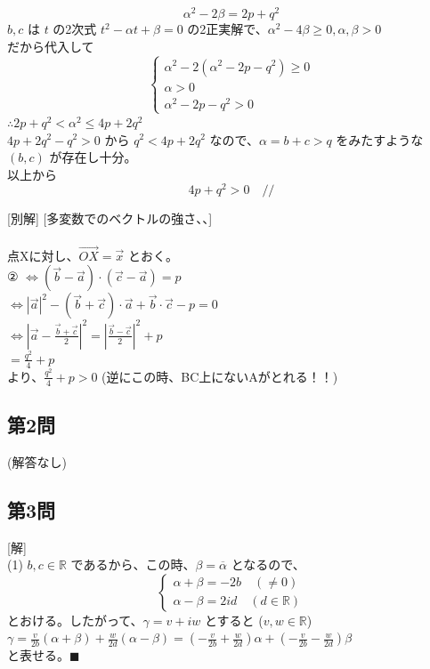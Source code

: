 \documentclass[../main.tex]{subfiles}
\begin{document}
\[ \alpha^2 - 2\beta = 2p + q^2 \]
$b, c$ は $t$ の2次式 $t^2 - \alpha t + \beta = 0$ の2正実解で、$\alpha^2 - 4\beta \ge 0, \alpha, \beta > 0$\\
だから代入して
\[
  \begin{cases}
    \alpha^2 - 2(\alpha^2 - 2p - q^2) \ge 0 \\
    \alpha > 0 \\
    \alpha^2 - 2p - q^2 > 0
  \end{cases}
\]
$\therefore 2p + q^2 < \alpha^2 \le 4p + 2q^2$\\
$4p + 2q^2 - q^2 > 0$ から $q^2 < 4p + 2q^2$ なので、$\alpha = b+c > q$ をみたすような $(b, c)$ が存在し十分。\\
以上から
\[ 4p + q^2 > 0 \quad \text{//} \]

[別解] [多変数でのベクトルの強さ、、]\\
\\
点Xに対し、$\overrightarrow{OX} = \vec{x}$ とおく。\\
② $\iff (\vec{b} - \vec{a}) \cdot (\vec{c} - \vec{a}) = p$\\
$\iff |\vec{a}|^2 - (\vec{b} + \vec{c}) \cdot \vec{a} + \vec{b} \cdot \vec{c} - p = 0$\\
$\iff \left| \vec{a} - \frac{\vec{b} + \vec{c}}{2} \right|^2 = \left| \frac{\vec{b} - \vec{c}}{2} \right|^2 + p$\\
$= \frac{q^2}{4} + p$\\
より、$\frac{q^2}{4} + p > 0$ (逆にこの時、BC上にないAがとれる！！)


\subsection*{第2問}
(解答なし)

\subsection*{第3問}
[解]\\
(1) $b, c \in \mathbb{R}$ であるから、この時、$\beta = \overline{\alpha}$ となるので、
\[
  \begin{cases}
    \alpha + \beta = -2b \quad (\neq 0) \\
    \alpha - \beta = 2id \quad (d \in \mathbb{R})
  \end{cases}
\]
とおける。したがって、$\gamma = v + iw$ とすると ($v, w \in \mathbb{R}$)\\
$\gamma = \frac{v}{2b}(\alpha + \beta) + \frac{w}{2d}(\alpha - \beta) = \left( -\frac{v}{2b} + \frac{w}{2d} \right) \alpha + \left( -\frac{v}{2b} - \frac{w}{2d} \right) \beta$\\
と表せる。$\blacksquare$
\end{document}
